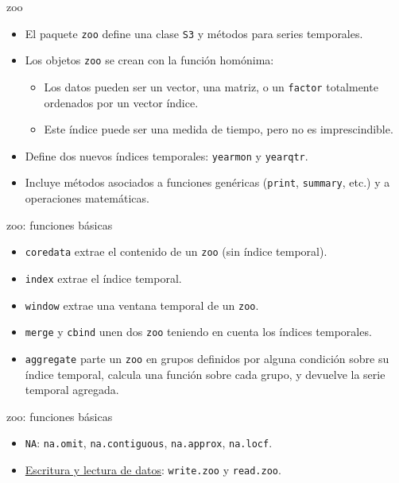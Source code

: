 \documentclass[xcolor={usenames,svgnames,dvipsnames}]{beamer}
\begin{document}
\begin{frame}[fragile,label=sec-1-1-2]{zoo}
 \begin{itemize}
\item El paquete \texttt{zoo} define una clase \texttt{S3} y métodos para series temporales.
\item Los objetos \texttt{zoo} se crean con la función homónima:
\begin{itemize}
\item Los datos pueden ser un vector, una matriz, o un \texttt{factor} totalmente ordenados por un vector índice.
\item Este índice puede ser una medida de tiempo, pero no es imprescindible.
\end{itemize}
\item Define dos nuevos índices temporales: \texttt{yearmon} y \texttt{yearqtr}.
\item Incluye métodos asociados a funciones genéricas (\texttt{print}, \texttt{summary},
etc.) y a operaciones matemáticas.
\end{itemize}
\end{frame}
\begin{frame}[fragile,label=sec-1-1-3]{zoo: funciones básicas}
 \begin{itemize}
\item \texttt{coredata} extrae el contenido de un \texttt{zoo} (sin índice temporal).
\item \texttt{index} extrae el índice temporal.
\item \texttt{window} extrae una ventana temporal de un \texttt{zoo}.
\item \texttt{merge} y \texttt{cbind} unen dos \texttt{zoo} teniendo en cuenta los índices temporales.
\item \texttt{aggregate} parte un \texttt{zoo} en grupos definidos por alguna condición
sobre su índice temporal, calcula una función sobre cada grupo, y
devuelve la serie temporal agregada.
\end{itemize}
\end{frame}

\begin{frame}[fragile,label=sec-1-1-4]{zoo: funciones básicas}
 \begin{itemize}
\item \texttt{NA}: \texttt{na.omit}, \texttt{na.contiguous}, \texttt{na.approx}, \texttt{na.locf}.

\item \href{http://cran.r-project.org/web/packages/zoo/vignettes/zoo-read.pdf}{Escritura y lectura de datos}: \texttt{write.zoo} y \texttt{read.zoo}.
\end{itemize}
\end{frame}
\end{document}
